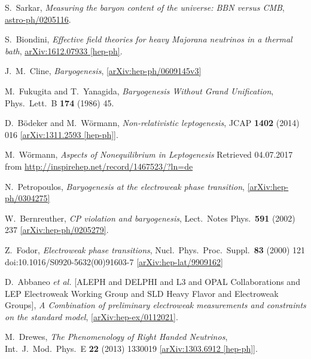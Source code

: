 \begin{thebibliography}{56}
S.~Sarkar,
\textit{Measuring the baryon content of the universe: BBN versus CMB}, \href{https://arxiv.org/abs/astro-ph/0205116}{astro-ph/0205116}.

S.~Biondini,
\textit{Effective field theories for heavy Majorana neutrinos in a thermal bath},
\href{https://arxiv.org/abs/1612.07933}{arXiv:1612.07933 [hep-ph]}.

J.~M.~Cline,
\textit{Baryogenesis}, 
\href{https://arxiv.org/abs/hep-ph/0609145v3}{[arXiv:hep-ph/0609145v3]}

M.~Fukugita and T.~Yanagida,
\textit{Baryogenesis Without Grand Unification},
Phys.\ Lett.\ B {\textbf{174}} (1986) 45.

D.~B\"odeker and M.~W\"ormann,
\textit{Non-relativistic leptogenesis},
JCAP {\textbf{1402}} (2014) 016
\href{https://arxiv.org/abs/1311.2593}{[arXiv:1311.2593 [hep-ph]]}.

M.~Wörmann,
\textit{Aspects of Nonequilibrium in Leptogenesis}
Retrieved 04.07.2017 from \href{http://inspirehep.net/record/1467523/?ln=de}{http://inspirehep.net/record/1467523/?ln=de}

N.~Petropoulos,
\textit{Baryogenesis at the electroweak phase transition},
\href{https://arxiv.org/abs/hep-ph/0304275}{[arXiv:hep-ph/0304275]}

W.~Bernreuther,
\textit{CP violation and baryogenesis},
Lect.\ Notes Phys.\  {\textbf{591}} (2002) 237
\href{https://arxiv.org/abs/hep-ph/0205279}{[arXiv:hep-ph/0205279]}.

Z.~Fodor,
\textit{Electroweak phase transitions},
Nucl.\ Phys.\ Proc.\ Suppl.\  {\textbf{83}} (2000) 121\newline
doi:10.1016/S0920-5632(00)91603-7
\href{https://arxiv.org/abs/hep-lat/9909162v1}{[arXiv:hep-lat/9909162]}

D.~Abbaneo {\textit{et al.}} [ALEPH and DELPHI and L3 and OPAL Collaborations and LEP Electroweak Working Group and SLD Heavy Flavor and Electroweak Groups],
\textit{A Combination of preliminary electroweak measurements and constraints on the standard model},
\href{https://arxiv.org/abs/hep-ex/0112021}{[arXiv:hep-ex/0112021]}.

M.~Drewes,
\textit{The Phenomenology of Right Handed Neutrinos},
Int.\ J.\ Mod.\ Phys.\ E {\textbf{22}} (2013) 1330019
\href{https://arxiv.org/abs/1303.6912}{[arXiv:1303.6912 [hep-ph]]}.


\end{thebibliography}
